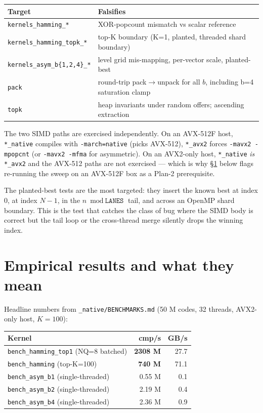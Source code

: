 \documentclass[11pt,a4paper]{article}
\begin{document}
\begin{center}
\begin{tabular}{ll}
\toprule
\textbf{Target} & \textbf{Falsifies} \\
\midrule
\texttt{kernels\_hamming\_*} & XOR-popcount mismatch vs scalar reference \\
\texttt{kernels\_hamming\_topk\_*} & top-K boundary (K=1, planted, threaded shard boundary) \\
\texttt{kernels\_asym\_b\{1,2,4\}\_*} & level grid mis-mapping, per-vector scale, planted-best \\
\texttt{pack} & round-trip pack$\to$unpack for all $b$, including b=4 saturation clamp \\
\texttt{topk} & heap invariants under random offers; ascending extraction \\
\bottomrule
\end{tabular}
\end{center}

The two SIMD paths are exercised independently. On an AVX-512F host,
\texttt{*\_native} compiles with \texttt{-march=native} (picks
AVX-512), \texttt{*\_avx2} forces \texttt{-mavx2 -mpopcnt} (or
\texttt{-mavx2 -mfma} for asymmetric). On an AVX2-only host,
\texttt{*\_native} \emph{is} \texttt{*\_avx2} and the AVX-512 paths
are not exercised --- which is why \S\ref{sec:results} below flags
re-running the sweep on an AVX-512F box as a Plan-2 prerequisite.

The planted-best tests are the most targeted: they insert the known
best at index 0, at index $N - 1$, in the $n \bmod \texttt{LANES}$
tail, and across an OpenMP shard boundary. This is the test that
catches the class of bug where the SIMD body is correct but the tail
loop or the cross-thread merge silently drops the winning index.

\section{Empirical results and what they mean}
\label{sec:results}

Headline numbers from \texttt{\_native/BENCHMARKS.md} (50 M codes, 32
threads, AVX2-only host, $K = 100$):

\begin{center}
\begin{tabular}{lrr}
\toprule
\textbf{Kernel} & \textbf{cmp/s} & \textbf{GB/s} \\
\midrule
\texttt{bench\_hamming\_top1} (NQ=8 batched) & \textbf{2308 M} & 27.7 \\
\texttt{bench\_hamming} (top-K=100) & \textbf{740 M} & 71.1 \\
\texttt{bench\_asym\_b1} (single-threaded) & 0.55 M & 0.1 \\
\texttt{bench\_asym\_b2} (single-threaded) & 2.19 M & 0.4 \\
\texttt{bench\_asym\_b4} (single-threaded) & 2.36 M & 0.9 \\
\bottomrule
\end{tabular}
\end{center}
\end{document}
